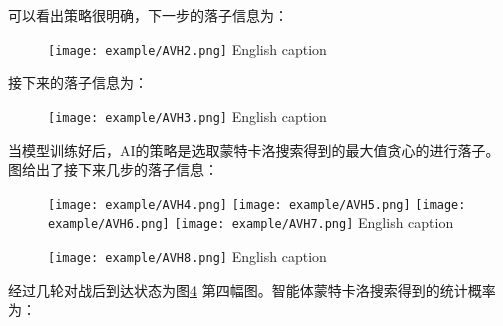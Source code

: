 可以看出策略很明确，下一步的落子信息为：

\begin{figure}[!htp]
	\centering
	\texttt{[image: example/AVH2.png]}
	\hspace{0.5cm}
	{English caption}
	\label{fig:human2}
\end{figure}
接下来的落子信息为：
\begin{figure}[!htp]
	\centering
	\texttt{[image: example/AVH3.png]}
	\hspace{0.5cm}
	{English caption}
	\label{fig:human3}
\end{figure}
当模型训练好后，AI的策略是选取蒙特卡洛搜索得到的最大值贪心的进行落子。图给出了接下来几步的落子信息：
\begin{figure}[!htp]
	\centering
	\texttt{[image: example/AVH4.png]}
	\hspace{0.5cm}
	\texttt{[image: example/AVH5.png]}
	\hspace{0.5cm}
	\texttt{[image: example/AVH6.png]}
	\hspace{0.5cm}
	\texttt{[image: example/AVH7.png]}
	{English caption}
	\label{fig:AIvsHuman}
\end{figure}
\begin{figure}[!htp]
	\centering
	\texttt{[image: example/AVH8.png]}
	\hspace{0.5cm}
	{English caption}
	\label{fig:human4}
\end{figure}

经过几轮对战后到达状态为图\ref{fig:human4} 第四幅图。智能体蒙特卡洛搜索得到的统计概率为：

